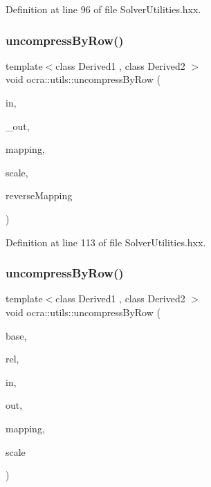 Definition at line 96 of file Solver\+Utilities.\+hxx.

\hypertarget{namespaceocra_1_1utils_a151ee2cecba7ea9527fbdc8be061cd98}{}\label{namespaceocra_1_1utils_a151ee2cecba7ea9527fbdc8be061cd98} 
\subsubsection{\texorpdfstring{uncompress\+By\+Row()}{uncompressByRow()}\hspace{0.1cm}{\footnotesize\ttfamily [1/2]}}
{\footnotesize\ttfamily template$<$class Derived1 , class Derived2 $>$ \\
void ocra\+::utils\+::uncompress\+By\+Row (\begin{DoxyParamCaption}\item[{const Matrix\+Base$<$ Derived1 $>$ \&}]{in,  }\item[{Matrix\+Base$<$ Derived2 $>$ const \&}]{\+\_\+out,  }\item[{const std\+::vector$<$ int $>$ \&}]{mapping,  }\item[{double}]{scale,  }\item[{bool}]{reverse\+Mapping }\end{DoxyParamCaption})\hspace{0.3cm}{\ttfamily [inline]}}



Definition at line 113 of file Solver\+Utilities.\+hxx.

\hypertarget{namespaceocra_1_1utils_aa1f9829f8b85e3b006b691a924b12e3f}{}\label{namespaceocra_1_1utils_aa1f9829f8b85e3b006b691a924b12e3f} 
\subsubsection{\texorpdfstring{uncompress\+By\+Row()}{uncompressByRow()}\hspace{0.1cm}{\footnotesize\ttfamily [2/2]}}
{\footnotesize\ttfamily template$<$class Derived1 , class Derived2 $>$ \\
void ocra\+::utils\+::uncompress\+By\+Row (\begin{DoxyParamCaption}\item[{const \hyperlink{classocra_1_1Variable}{Variable} \&}]{base,  }\item[{const \hyperlink{classocra_1_1Variable}{Variable} \&}]{rel,  }\item[{const Matrix\+Base$<$ Derived1 $>$ \&}]{in,  }\item[{Matrix\+Base$<$ Derived2 $>$ const \&}]{out,  }\item[{std\+::vector$<$ int $>$ \&}]{mapping,  }\item[{double}]{scale }\end{DoxyParamCaption})\hspace{0.3cm}{\ttfamily [inline]}}



